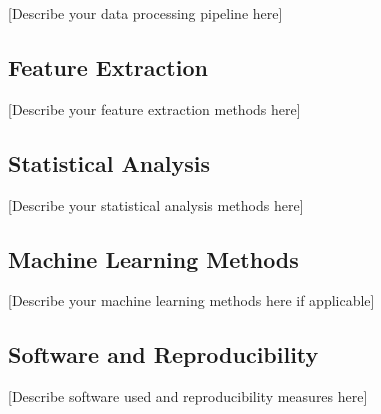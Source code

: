 [Describe your data processing pipeline here]

\subsection{Feature Extraction}


[Describe your feature extraction methods here]

\subsection{Statistical Analysis}

[Describe your statistical analysis methods here]

\subsection{Machine Learning Methods}


[Describe your machine learning methods here if applicable]

\subsection{Software and Reproducibility}


[Describe software used and reproducibility measures here]

\label{sec:methods}

